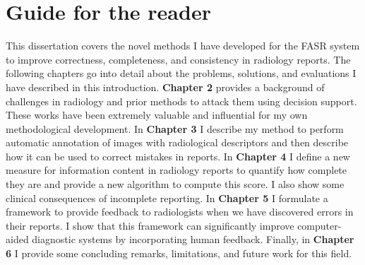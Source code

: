 \section{Guide for the reader}
This dissertation covers the novel methods I have developed for the FASR system to improve correctness, completeness, and consistency in radiology reports. The following chapters go into detail about the problems, solutions, and evaluations I have described in this introduction. \textbf{Chapter 2} provides a background of challenges in radiology and prior methods to attack them using decision support. These works have been extremely valuable and influential for my own methodological development. In \textbf{Chapter 3} I describe my method to perform automatic annotation of images with radiological descriptors and then describe how it can be used to correct mistakes in reports. In \textbf{Chapter 4} I define a new measure for information content in radiology reports to quantify how complete they are and provide a new algorithm to compute this score. I also show some clinical consequences of incomplete reporting. In \textbf{Chapter 5} I formulate a framework to provide feedback to radiologists when we have discovered errors in their reports. I show that this framework can significantly improve computer-aided diagnostic systems by incorporating human feedback. Finally, in \textbf{Chapter 6} I provide some concluding remarks, limitations, and future work for this field.
